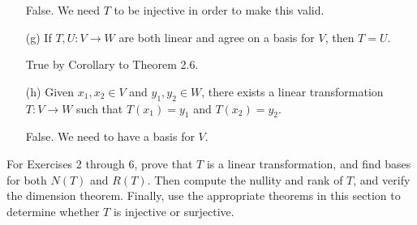 \begin{enumerate}
\begin{solution}
            False. We need \( T  \) to be injective in order to make this valid.
        \end{solution} 
    \item[(g)] If \( T,U  : V \to W  \) are both linear and agree on a basis for \( V  \), then \( T = U  \).
        \begin{solution}
            True by Corollary to Theorem 2.6.
        \end{solution}
    \item[(h)] Given \( x_{1}, x_{2} \in V  \) and \( y_{1}, y_{2} \in W  \), there exists a linear transformation \( T: V \to W  \) such that \( T(x_{1}) =y_{1}  \) and \( T(x_{2}) =y_{2} \). 
        \begin{solution}
           False. We need to have a basis for \( V  \). 
        \end{solution}
\end{enumerate}

For Exercises 2 through 6, prove that \( T  \) is a linear transformation, and find bases for both \( N(T) \) and \( R(T) \). Then compute the nullity and rank of \( T  \), and verify the dimension theorem. Finally, use the appropriate theorems in this section to determine whether \( T  \) is injective or surjective.

